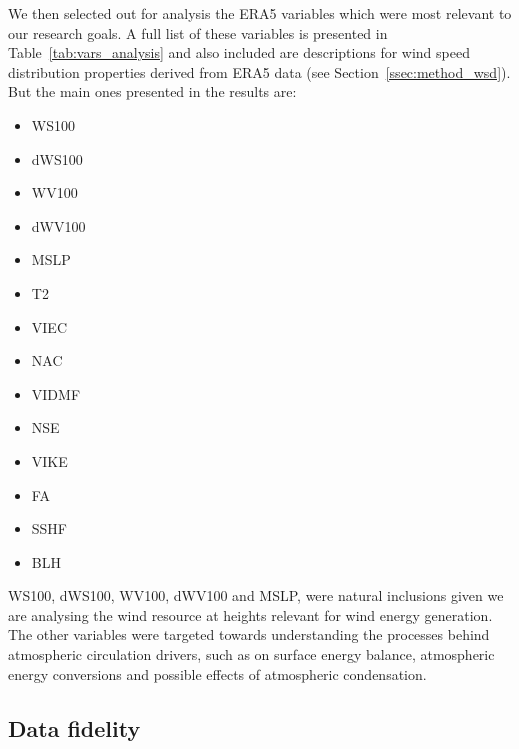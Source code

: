 We then selected out for analysis the \ac{ERA5} variables which were most relevant to our research goals. A full list of these variables is presented in Table~\ref{tab:vars_analysis} and also included are descriptions for wind speed distribution properties derived from \ac{ERA5} data (see Section~\ref{ssec:method_wsd}). But the main ones presented in the results are:
\begin{itemize}
	\item \acf{WS100}
	\item \acf{dWS100}
	\item \acf{WV100}
	\item \acf{dWV100}
	\item \acf{MSLP}
	\item \acf{T2}
	\item \acf{VIEC}
	\item \acf{NAC}
	\item \acf{VIDMF}
	\item \acf{NSE}
	\item \acf{VIKE}
	\item \acf{FA}
	\item \acf{SSHF}
	\item \acf{BLH}
\end{itemize}

\ac{WS100}, \ac{dWS100}, \ac{WV100}, \ac{dWV100} and \ac{MSLP}, were natural inclusions given we are analysing the wind resource at heights relevant for wind energy generation. The other variables were targeted towards understanding the processes behind atmospheric circulation drivers, such as on surface energy balance, atmospheric energy conversions and possible effects of atmospheric condensation.

\subsection{Data fidelity}

